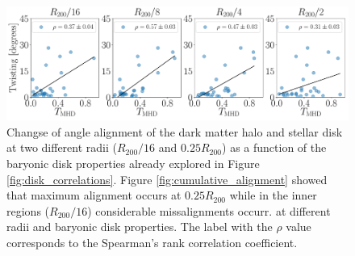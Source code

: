 \documentclass[a4paper,fleqn,usenatbib]{mnras}
\begin{document}
\begin{figure}
\begin{center}
\includegraphics[width=1.0\textwidth]{correlations_twisting_triaxiality_MHD.pdf}
\end{center}
\caption{Changse of angle alignment of the dark
  matter halo and stellar disk at two different radii ($R_{200}/16$
  and $0.25R_{200}$) as a function of the baryonic disk properties
  already explored in Figure \ref{fig:disk_correlations}.  
  Figure \ref{fig:cumulative_alignment} showed that maximum alignment
  occurs at $0.25R_{200}$ while in the inner regions ($R_{200}/16$)
  considerable missalignments occurr.
 at different radii
 and baryonic disk properties. 
 The label with the $\rho$ value corresponds to the Spearman’s rank correlation coefficient. }
\label{fig:alignment_correlations}
\end{figure}
\end{document}
